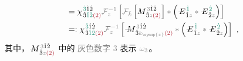 \begin{subequations}
\begin{align}
	&= {\chi}^{\;\! \textcolor{PineGreen}{\hat{3}} \hat{1} \hat{2} }_{\;\! \hat{3} \textcolor{PineGreen}{\hat{1} \hat{2}} \textcolor{Maroon}{(2)}} \mathcolor{gray}{\mathcal F_{z}^{-1}} \left[ \mathcolor{gray}{\mathcal F_{\bar{k}}} \left[ M^{\;\! \mathcolor{gray}{3} \hat{1} \hat{2} }_{\;\! \hat{3} \mathcolor{gray}{z} \textcolor{Maroon}{(2)} } \right] \mathcolor{gray}{*} \left( \Xint{\mathcolor{gray}{-}}{295}{E}^{\;\! \textcolor{PineGreen}{\hat{1}}}_{\;\! \hat{1} \mathcolor{gray}{z}} \mathcolor{gray}{*} \Xint{\mathcolor{gray}{-}}{295}{E}^{\;\! \textcolor{PineGreen}{\hat{2}}}_{\;\! \hat{2} \mathcolor{gray}{z}} \right) \right] \label{eq:DP^(2)-3_12-C5} \\
	&=: {\chi}^{\;\! \textcolor{PineGreen}{\hat{3}} \hat{1} \hat{2} }_{\;\! \hat{3} \textcolor{PineGreen}{\hat{1} \hat{2}} \textcolor{Maroon}{(2)}} \mathcolor{gray}{\mathcal F_{z}^{-1}} \left[ \Xint{\mathcolor{gray}{-}}{18}{M}^{\;\! \mathcolor{gray}{3} \hat{1} \hat{2} }_{\;\! \hat{3} \mathcolor{gray}{k_{\symup{z}}} \textcolor{Maroon}{(2)} } \mathcolor{gray}{*} \left( \Xint{\mathcolor{gray}{-}}{295}{E}^{\;\! \textcolor{PineGreen}{\hat{1}}}_{\;\! \hat{1} \mathcolor{gray}{z}} \mathcolor{gray}{*} \Xint{\mathcolor{gray}{-}}{295}{E}^{\;\! \textcolor{PineGreen}{\hat{2}}}_{\;\! \hat{2} \mathcolor{gray}{z}} \right) \right] ~, \label{eq:DP^(2)-3_12-C6}
\end{align}
\end{subequations}
其中，$\Xint{\mathcolor{gray}{-}}{18}{M}^{\;\! \mathcolor{gray}{3} \hat{1} \hat{2} }_{\;\! \hat{3} \mathcolor{gray}{z} \textcolor{Maroon}{(2)} }$ 中的 \textcolor{gray}{灰色数字 3} 表示 $\mathcolor{gray}{\omega}_{\textcolor{gray}{3}}$。

